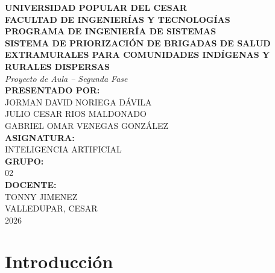 \documentclass[12pt]{article}
\begin{document}
\begin{titlepage}
    \centering
    
    {\normalsize \textbf{UNIVERSIDAD POPULAR DEL CESAR}}\\[0.3cm]
    {\normalsize \textbf{FACULTAD DE INGENIERÍAS Y TECNOLOGÍAS}}\\[0.3cm]
    {\normalsize \textbf{PROGRAMA DE INGENIERÍA DE SISTEMAS}}\\[2.5cm]
    
    {\large \textbf{SISTEMA DE PRIORIZACIÓN DE BRIGADAS DE SALUD EXTRAMURALES PARA COMUNIDADES INDÍGENAS Y RURALES DISPERSAS}}\\[0.4cm]
    {\normalsize \textit{Proyecto de Aula -- Segunda Fase}}\\[2.5cm]
    
    {\normalsize \textbf{PRESENTADO POR:}}\\[0.4cm]
    {\normalsize JORMAN DAVID NORIEGA DÁVILA}\\
    {\normalsize JULIO CESAR RIOS MALDONADO}\\
    {\normalsize GABRIEL OMAR VENEGAS GONZÁLEZ}\\[1.2cm]
    
    {\normalsize \textbf{ASIGNATURA:}}\\
    {\normalsize INTELIGENCIA ARTIFICIAL}\\[0.5cm]
    
    {\normalsize \textbf{GRUPO:}}\\
    {\normalsize 02}\\[0.5cm]
    
    {\normalsize \textbf{DOCENTE:}}\\
    {\normalsize TONNY JIMENEZ}\\[1.8cm]
    
    {\normalsize VALLEDUPAR, CESAR}\\
    {\normalsize 2026}
    
\end{titlepage}

\tableofcontents
\newpage

\section{Introducción}
\end{document}
